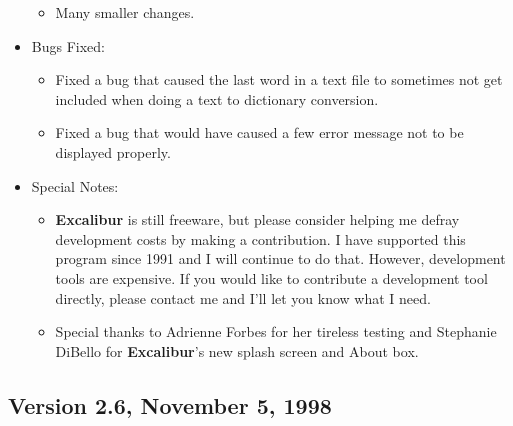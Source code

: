 \documentclass[11pt,titlepage]{article}
\newcommand{\ex}{\textbf{Excalibur}}
\begin{document}
\begin{itemize}
\begin{itemize}
  \item Many smaller changes.

  \end{itemize}

\item Bugs Fixed:
  \begin{itemize}

  \item Fixed a bug that caused the last word in a text file to
    sometimes not get included when doing a text to dictionary
    conversion.

  \item Fixed a bug that would have caused a few error message not to
    be displayed properly.

  \end{itemize}

\item Special Notes:

  \begin{itemize}

  \item \ex{} is still freeware, but please consider helping me defray
    development costs by making a contribution.  I have supported this
    program since 1991 and I will continue to do that.  However,
    development tools are expensive.  If you would like to contribute
    a development tool directly, please contact me and I'll let you
    know what I need.

  \item Special thanks to Adrienne Forbes for her tireless testing and
    Stephanie DiBello for \ex's new splash screen and About box.

  \end{itemize}

\end{itemize}


\subsection{Version 2.6, November 5, 1998}
\end{document}
